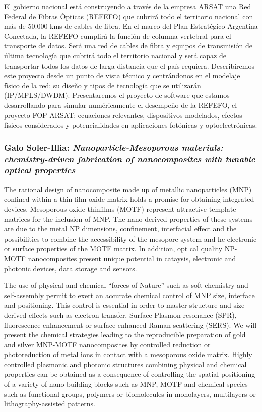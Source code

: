 El gobierno nacional est\'a construyendo a trav\'es de la empresa ARSAT una Red
Federal de Fibras \'Opticas (REFEFO) que cubrir\'a todo el territorio nacional
con m\'as de 50.000 kms de cables de fibra. En el marco del Plan Estrat\'egico
Argentina Conectada, la REFEFO cumplir\'a la funci\'on de columna vertebral para
el transporte de datos. Ser\'a una red de cables de fibra y equipos de
transmisi\'on de \'ultima tecnolog\'ia que cubrir\'a todo el territorio nacional
y ser\'a capaz de transportar todos los datos de larga distancia que el pa\'is
requiera. Describiremos este proyecto desde un punto de vista t\'ecnico y
centr\'andonos en el modelaje f\'isico de la red: su diseño y tipos de
tecnolog\'ia que se utilizar\'an (IP/MPLS/DWDM). Presentaremos el proyecto de
software que estamos desarrollando para simular num\'ericamente el desempeño de
la REFEFO, el proyecto FOP-ARSAT: ecuaciones relevantes, dispositivos modelados,
efectos f\'isicos considerados y potencialidades en aplicaciones fot\'onicas y
optoelectr\'onicas.

\subsubsection*{Galo Soler-Illia: \textit{Nanoparticle-Mesoporous materials:
chemistry-driven fabrication of nanocomposites with tunable optical properties}}

The rational design of nanocomposite made up of metallic nanoparticles
(MNP) confined within a thin film oxide matrix holds a promise for obtaining
integrated devices. Mesoporous oxide thinfilms (MOTF) represent attractive
template matrices for the inclusion of MNP. The nano-derived properties of these
systems are due to the metal NP dimensions, confinement, interfacial effect
 and the possibilities to combine the accessibility of the mesopore system and 
he electronic or surface properties of the MOTF matrix. In addition,  opt
cal quality NP-MOTF nanocomposites present unique potential in cataysis,
electronic and photonic devices, data storage and sensors.              

The use of physical and chemical ``forces of Nature'' such as soft chemistry and
self-assembly permit to exert an accurate chemical control of MNP size,
interface and positioning. This control is essential in order to master
structure and size-derived effects such as electron transfer, Surface Plasmon
resonance (SPR), fluorescence enhancement or surface-enhanced Raman
scattering (SERS). We will present the chemical strategies leading to the
reproducible preparation of gold and silver MNP-MOTF nanocomposites by
controlled reduction or photoreduction of metal ions in contact with a
mesoporous oxide matrix. Highly controlled plasmonic and photonic structures
combining physical and chemical properties can be obtained as a consequence of
controlling the spatial positioning of a variety of nano-building blocks such as
MNP, MOTF and chemical species such as functional groups, polymers or
biomolecules in monolayers, multilayers or lithography-assisted patterns.

